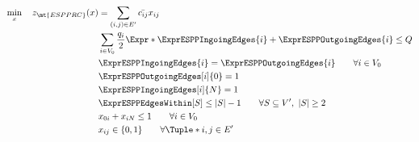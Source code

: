 \begin{align}
	\min_{x} \quad z_\mt{ESPPRC}(x) & =  \sum_{(i, j) \in E^\prime} \bar{c_{ij}} x_{ij} \label{eq:espprc-obj-function}                                                                                                               \\
	                                & \sum_{i \in V_0} \frac{q_i}{2} \Expr*{ \ExprESPPIngoingEdges{i} + \ExprESPPOutgoingEdges{i} }  \le Q                            \label{eq:espprc-resource-upper-bound-constraint}              \\
	                                & \ExprESPPIngoingEdges{i} = \ExprESPPOutgoingEdges{i}                                                \qquad \forall i \in V_0          \label{eq:espprc-flow-conservation-constraint-customers} \\
	                                & \ExprESPPOutgoingEdges[i]{0} = 1                                                                                                      \label{eq:espprc-flow-conservation-constraint-depot1}    \\
	                                & \ExprESPPIngoingEdges[i]{N} = 1                                                                                                       \label{eq:espprc-flow-conservation-constraint-depot2}    \\
	                                & \ExprESPPEdgesWithin[S] \le |S| - 1                                                                  \qquad \forall S \subseteq V^\prime,\ |S| \ge 2 \label{eq:espprc-sec-constraints}         \\
	                                & x_{0i} + x_{iN} \le 1                                                                                \qquad \forall i \in V_0         \label{eq:espprc-binding-directed}                       \\
	                                & x_{ij}                   \in \lbrace 0, 1 \rbrace                                                    \qquad \forall \Tuple*{i, j} \in E^\prime    \label{eq:espprc-x-mip-var-bounds}           \\
\end{align}

